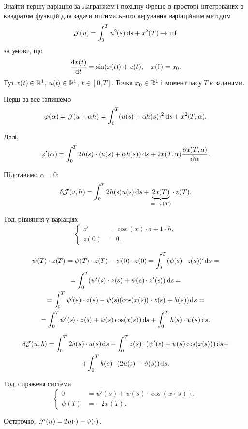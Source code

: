 \begin{problem}
	Знайти першу варіацію за Лагранжем і похідну Фреше в просторі інтегрованих з квадратом функцій для задачи оптимального керування варіаційним методом \[ \mathcal{J}(u) = \int_0^T u^2(s) \mathop{}\!\mathrm{d} s + x^2(T) \to \inf \] за умови, що \[ \frac{\mathop{}\!\mathrm{d} x(t)}{\mathop{}\!\mathrm{d} t} = \sin (x(t)) + u(t), \quad x(0) = x_0. \] Тут $x(t) \in \mathbb{R}^1$, $u(t)\in\mathbb{R}^1$, $t\in[0,T]$. Точки $x_0\in\mathbb{R}^1$ і момент часу $T$ є заданими.
\end{problem}

\begin{solution}
	Перш за все запишемо
	\[ \varphi(\alpha) = \mathcal{J}(u + \alpha h) = \int_0^T (u(s) + \alpha h(s))^2 \mathop{}\!\mathrm{d} s + x^2(T, \alpha). \]

	Далі, \[ \varphi'(\alpha) = \int_0^T 2 h(s) \cdot (u(s) + \alpha h(s)) \mathop{}\!\mathrm{d} s + 2 x (T, \alpha) \frac{\partial x(T, \alpha)}{\partial \alpha}. \]

	Підставимо $\alpha = 0$: \[ \delta \mathcal{J}(u, h) = \int_0^T 2 h(s) u(s) \mathop{}\!\mathrm{d} s + \underset{=-\psi(T)}{\underbrace{2 x(T)}} \cdot z(T).\] 

	Тоді рівняння у варіаціях \[ \left\{ \begin{aligned} 
		z' &= \cos(x) \cdot z + 1 \cdot h, \\
		z(0) &= 0.
	\end{aligned} \right. \]

	\begin{multline*} 
		\psi(T) \cdot z(T) = \psi(T) \cdot z(T) - \psi(0) \cdot z(0) = \int_0^T (\psi(s) \cdot z(s))' \mathop{}\!\mathrm{d} s = \\
		= \int_0^T (\psi'(s) \cdot z(s) + \psi(s) \cdot z'(s)) \mathop{}\!\mathrm{d} s = \\
		= \int_0^T \psi'(s) \cdot z(s) + \psi(s) (\cos(x(s)) \cdot z(s) + h(s)) \mathop{}\!\mathrm{d} s = \\
		= \int_0^T \psi'(s) \cdot z(s) + \psi(s) \cos(x(s)) \mathop{}\!\mathrm{d} s + \int_0^T h(s) \cdot \psi(s) \mathop{}\!\mathrm{d} s.
	\end{multline*}

	\begin{multline*} 
		\delta \mathcal{J}(u, h) = \int_0^T 2 h(s) \cdot u(s) \mathop{}\!\mathrm{d} s - \int_0^T z(s) \cdot (\psi'(s) + \psi(s) \cos (x(s))) \mathop{}\!\mathrm{d} s + \\ + \int_0^T h(s) \cdot (2 u(s) - \psi(s)) \mathop{}\!\mathrm{d} s.
	\end{multline*}

	Тоді спряжена система \[ \left\{ \begin{aligned} 
		0 &= \psi'(s) + \psi(s) \cdot \cos(x(s)), \\
		\psi(T) &= - 2 x(T).
	\end{aligned} \right. \]

	Остаточно, $\mathcal{J}'(u) = 2 u(\cdot) - \psi(\cdot)$.
\end{solution}

